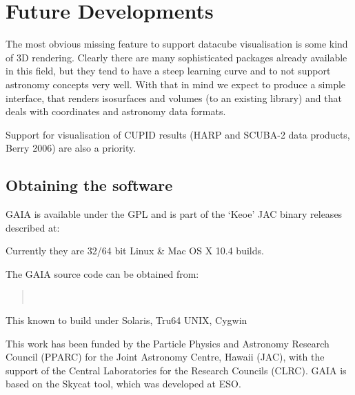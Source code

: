 \documentclass[11pt,twoside]{article}  %
\begin{document}
\section{Future Developments}

The most obvious missing feature to support datacube visualisation is some
kind of 3D rendering. Clearly there are many sophisticated packages already
available in this field, but they tend to have a steep learning curve and to
not support astronomy concepts very well. With that in mind we expect to
produce a simple interface, that renders isosurfaces and volumes (to an
existing library) and that deals with coordinates and astronomy data formats.

Support for visualisation of CUPID results (HARP and SCUBA-2 data products,
Berry 2006) are also a priority.

\subsection{Obtaining the software}

GAIA is available under the GPL and is part of the `Keoe' JAC binary releases
described at:
\begin{quote}
\end{quote}
Currently they are 32/64 bit Linux \& Mac OS X 10.4 builds.

The GAIA source code can be obtained from:
\begin{quote}
 \\
\end{quote}
This known to build under Solaris, Tru64 UNIX, Cygwin

\acknowledgments

This work has been funded by the Particle Physics and Astronomy Research
Council (PPARC) for the Joint Astronomy Centre, Hawaii (JAC), with the support
of the Central Laboratories for the Research Councils (CLRC). GAIA is based on
the Skycat tool, which was developed at ESO.
\end{document}
